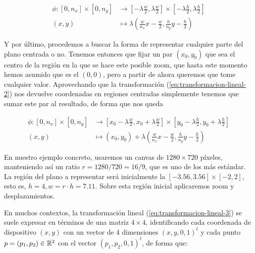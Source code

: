 \begin{equation}
    \label{eq:transformacion-lineal-2}
    \begin{split}
        \phi:[0,n_x]\times[0,n_y] & \longrightarrow \left[-\lambda\frac{w}{2},\lambda\frac{w}{2}\right]\times\left[-\lambda\frac{h}{2},\lambda\frac{h}{2}\right] \\
        (x,y) & \longmapsto \lambda\left(\frac{w}{n_x}x-\frac{w}{2},\frac{h}{n_y}y-\frac{h}{2}\right)
    \end{split}
\end{equation}

Y por último, procedemos a buscar la forma de representar cualquier parte del plano centrada o no. Tenemos entonces que fijar un par $(x_0,y_0)$ que sea el centro de la región en la que se hace este posible zoom, que hasta este momento hemos asumido que es el $(0,0)$, pero a partir de ahora queremos que tome cualquier valor. Aprovechando que la transformación (\ref{eq:transformacion-lineal-2}) nos devuelve coordenadas en regiones centradas simplemente tenemos que sumar este par al resultado, de forma que nos queda 

\begin{equation}
    \label{eq:transformacion-lineal-3}
    \begin{split}
        \phi:[0,n_x]\times[0,n_y] & \longrightarrow \left[x_0-\lambda\frac{w}{2},x_0+\lambda\frac{w}{2}\right]\times\left[y_0-\lambda\frac{h}{2},y_0+\lambda\frac{h}{2}\right] \\
        (x,y) & \longmapsto (x_0,y_0) + \lambda\left(\frac{w}{n_x}x-\frac{w}{2},\frac{h}{n_y}y-\frac{h}{2}\right)
    \end{split}
\end{equation}

En nuestro ejemplo concreto, usaremos un canvas de $1280\times 720$ píxeles, manteniendo así un ratio $r=1280/720=16/9$, que es uno de los más estándar. La región del plano a representar será inicialmente la $[-3.56,3.56]\times[-2,2]$, esto es, $h=4, w=r\cdot h =7.11$. Sobre esta región inicial aplicaremos zoom y desplazamientos.

En muchos contextos, la transformación lineal (\ref{eq:transformacion-lineal-3}) se suele expresar en términos de una matriz $4\times 4$, identificando cada coordenada de dispositivo $(x,y)$ con un vector de 4 dimensiones $(x,y,0,1)^t$ y cada punto $p=(p_1,p_2)\in\mathbb{R}^2$ con el vector $(p_1, p_2, 0 ,1)^t$, de forma que:

